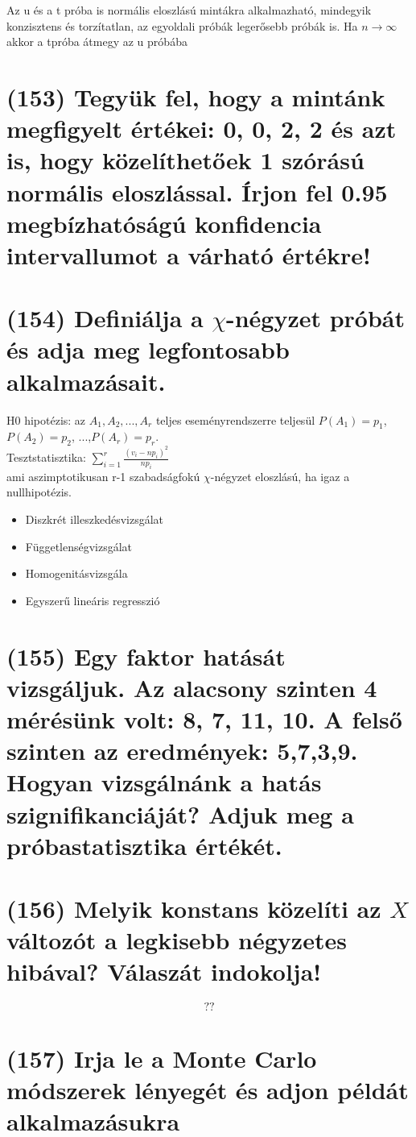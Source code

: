 \documentclass[12p]{article}
\begin{document}
Az u és a t próba is normális eloszlású mintákra alkalmazható, mindegyik konzisztens és torzítatlan, az egyoldali próbák legerősebb próbák is. Ha $n \rightarrow \infty$ akkor a tpróba átmegy az u próbába

\section{(153) Tegyük fel, hogy a mintánk megfigyelt értékei: 0, 0, 2, 2 és azt is, hogy közelíthetőek 1 szórású normális eloszlással. Írjon fel 0.95 megbízhatóságú konfidencia intervallumot a várható értékre!}

\section{(154) Definiálja a $\chi$-négyzet próbát és adja meg legfontosabb alkalmazásait.}

H0 hipotézis: az $A_1, A_2, ..., A_r$ teljes eseményrendszerre teljesül $P(A_1)=p_1$, $P(A_2)=p_2$, ...,$P(A_r)=p_r$.\\
Tesztstatisztika: $\displaystyle{ \sum^r_{i=1} \frac{(v_i - np_i)^2}{np_i}}$\\
ami aszimptotikusan r-1 szabadságfokú $\chi$-négyzet eloszlású, ha igaz a nullhipotézis. 

\begin{itemize}
	\item Diszkrét illeszkedésvizsgálat
	\item Függetlenségvizsgálat
	\item Homogenitásvizsgála
	\item Egyszerű lineáris regresszió
\end{itemize}

\section{(155) Egy faktor hatását vizsgáljuk. Az alacsony szinten 4 mérésünk volt: 8, 7, 11, 10. A felső
szinten az eredmények: 5,7,3,9. Hogyan vizsgálnánk a hatás szignifikanciáját? Adjuk meg
a próbastatisztika értékét.}

\section{(156) Melyik konstans közelíti az $X$ változót a legkisebb négyzetes hibával? Válaszát indokolja!}

$$??$$

\section{(157)  Irja le a Monte Carlo módszerek lényegét és adjon példát alkalmazásukra}
\end{document}

